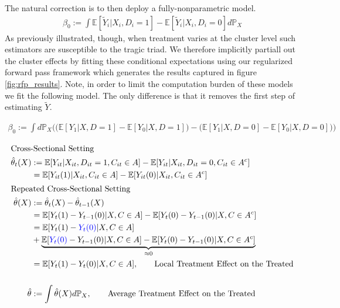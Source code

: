 \documentclass[a4paper,12pt]{article}
\begin{document}
The natural correction is to then deploy a fully-nonparametric model. 
\begin{align*}
\beta_0 := \int \mathbb{E}[\tilde{Y}_i | X_i, D_i=1] - \mathbb{E}[\tilde{Y}_i | X_i, D_i=0] d\mathbb{P}_X
\end{align*}
As previously illustrated, though, when treatment varies at the cluster level such estimators are susceptible to the tragic triad. We therefore implicitly partiall out the cluster effects by fitting these conditional expectations using our regularized forward pass framework which generates the results captured in figure \ref{fig:rfp_results}. Note, in order to limit the computation burden of these models we fit the following model. The only difference is that it removes the first step of estimating $\tilde{Y}$. 

\begin{align*}
    \beta _0 := \int d\mathbb{P}_X\Big(\big(\mathbb{E}[Y_1 |X,D=1] - \mathbb{E}[Y_0 |X,D=1]\big) -  \big(\mathbb{E}[Y_1 |X,D=0] - \mathbb{E}[Y_0 |X,D=0]\big)\Big)
\end{align*}

\begin{align*}
\intertext{Cross-Sectional Setting}
    \hat{\theta}_t(X) &:= \mathbb{E}[Y_{it} |X_{it}, D_{it}=1, C_{it} \in A] - \mathbb{E}[Y_{it} |X_{it}, D_{it}=0, C_{it} \in A^c] \\ 
    &= \mathbb{E}[Y_{it}(1) |X_{it}, C_{it} \in A] - \mathbb{E}[Y_{it}(0) |X_{it}, C_{it} \in A^c] \\ 
\intertext{Repeated Cross-Sectional Setting}
    \hat{\theta}(X) &:=     \hat{\theta}_t(X)  - \hat{\theta}_{t-1}(X)  \\ 
    &= \mathbb{E}[Y_{t}(1) - Y_{t-1}(0)|X, C \in A] -  \mathbb{E}[Y_{t}(0) - Y_{t-1}(0)|X, C \in A^c] \\ 
    &= \mathbb{E}[Y_{t}(1) - \textcolor{blue}{Y_{t}(0)}|X, C \in A] \\ 
    &+ \underbrace{ \mathbb{E}[\textcolor{blue}{Y_{t}(0)} - Y_{t-1}(0)|X, C \in A] -  \mathbb{E}[Y_{t}(0) - Y_{t-1}(0)|X, C \in A^c]}_{\approx 0 } \\ 
    &= \mathbb{E}[Y_{t}(1) -  Y_{t}(0)|X, C \in A], \quad \quad  \textrm{Local Treatment Effect on the Treated} \\ \\
\hat{\theta} &:= \int \hat{\theta}(X)d\mathbb{P}_X, \quad \quad  \textrm{Average Treatment Effect on the Treated}
\end{align*}
\end{document}
